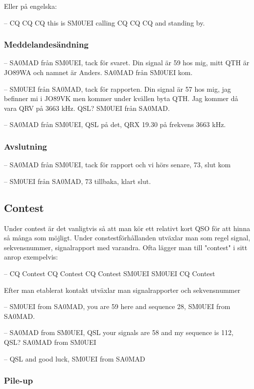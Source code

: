 Eller på engelska:

-- CQ CQ CQ this is SM0UEI calling CQ CQ CQ and standing by.

\subsubsection{Meddelandesändning}

-- SA0MAD från SM0UEI, tack för svaret. Din signal är 59 hos mig, mitt QTH är JO89WA och namnet är Anders. SA0MAD från SM0UEI kom.

-- SM0UEI från SA0MAD, tack för rapporten. Din signal är 57 hos mig, jag befinner mi i JO89VK men kommer under kvällen byta QTH. Jag kommer då vara QRV på 3663 kHz. QSL? SM0UEI från SA0MAD.

-- SA0MAD från SM0UEI, QSL på det, QRX 19.30 på frekvens 3663 kHz. 

\subsubsection{Avslutning}

-- SA0MAD från SM0UEI, tack för rapport och vi hörs senare, 73, slut kom

-- SM0UEI från SA0MAD, 73 tillbaka, klart slut.

\subsection{Contest}

Under contest är det vanligtvis så att man kör ett relativt kort QSO för att hinna så många som möjligt. Under constestförhållanden utväxlar man som regel signal, sekvensnummer, signalrapport med varandra. Ofta lägger man till "contest" i sitt anrop exempelvis:

-- CQ Contest CQ Contest CQ Contest SM0UEI SM0UEI CQ Contest

Efter man etablerat kontakt utväxlar man signalrapporter och sekvensnummer

-- SM0UEI from SA0MAD, you are 59 here and sequence 28, SM0UEI from SA0MAD.

-- SA0MAD from SM0UEI, QSL your signals are 58 and my sequence is 112, QSL? SA0MAD from SM0UEI

-- QSL and good luck, SM0UEI from SA0MAD

\subsubsection{Pile-up}

